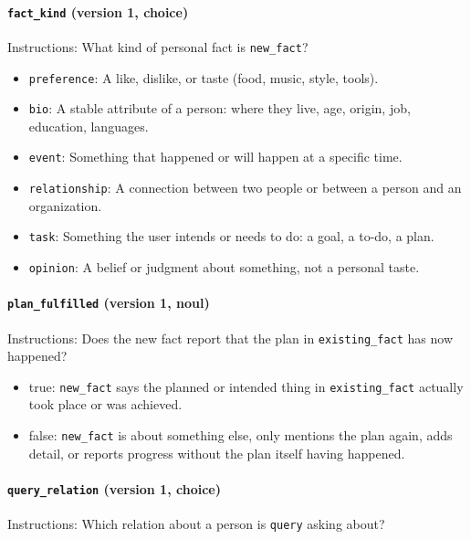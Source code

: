 \documentclass[11pt]{article}
\begin{document}
\paragraph{\texttt{fact\_\allowbreak{}kind} (version 1, choice)}
Instructions: What kind of personal fact is \texttt{new\_\allowbreak{}fact}?

\begin{itemize}
\item \texttt{preference}: A like, dislike, or taste (food, music, style, tools).
\item \texttt{bio}: A stable attribute of a person: where they live, age, origin, job, education, languages.
\item \texttt{event}: Something that happened or will happen at a specific time.
\item \texttt{relationship}: A connection between two people or between a person and an organization.
\item \texttt{task}: Something the user intends or needs to do: a goal, a to-do, a plan.
\item \texttt{opinion}: A belief or judgment about something, not a personal taste.
\end{itemize}
\paragraph{\texttt{plan\_\allowbreak{}fulfilled} (version 1, noul)}
Instructions: Does the new fact report that the plan in \texttt{existing\_\allowbreak{}fact} has now happened?

\begin{itemize}
\item true: \texttt{new\_\allowbreak{}fact} says the planned or intended thing in \texttt{existing\_\allowbreak{}fact} actually took place or was achieved.
\item false: \texttt{new\_\allowbreak{}fact} is about something else, only mentions the plan again, adds detail, or reports progress without the plan itself having happened.
\end{itemize}
\paragraph{\texttt{query\_\allowbreak{}relation} (version 1, choice)}
Instructions: Which relation about a person is \texttt{query} asking about?
\end{document}
